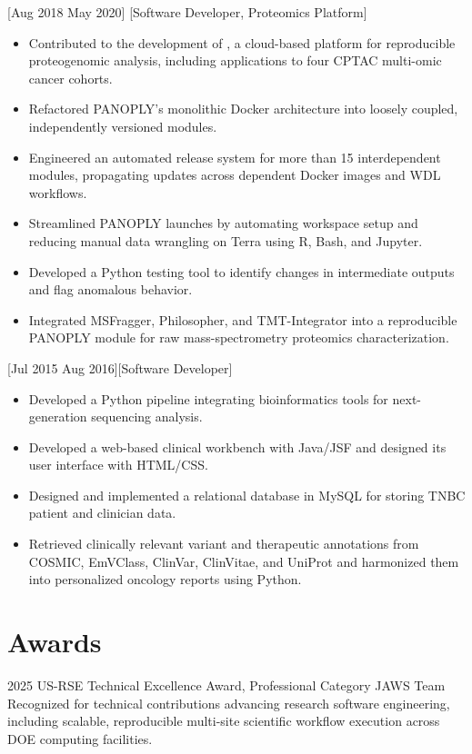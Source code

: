 \documentclass[11pt]{article}
\begin{document}
\jobseparator
{}[Aug 2018 \textendash{} May 2020]
  [Software Developer, Proteomics Platform]
\begin{itemize}
  \item Contributed to the development of , a cloud-based platform for reproducible proteogenomic analysis, including applications to four CPTAC multi-omic cancer cohorts.
  \item Refactored PANOPLY's monolithic Docker architecture into loosely coupled, independently versioned modules.
  \item Engineered an automated release system for more than 15 interdependent modules, propagating updates across dependent Docker images and WDL workflows.
  \item Streamlined PANOPLY launches by automating workspace setup and reducing manual data wrangling on Terra using R, Bash, and Jupyter.
  \item Developed a Python testing tool to identify changes in intermediate outputs and flag anomalous behavior.
  \item Integrated MSFragger, Philosopher, and TMT-Integrator into a reproducible PANOPLY module for raw mass-spectrometry proteomics characterization.
\end{itemize}

\jobseparator
{}[Jul 2015 \textendash{} Aug 2016][Software Developer]
\begin{itemize}
  \item Developed a Python pipeline integrating bioinformatics tools for next-generation sequencing analysis.
  \item Developed a web-based clinical workbench with Java/JSF and designed its user interface with HTML/CSS.
  \item Designed and implemented a relational database in MySQL for storing TNBC patient and clinician data.
  \item Retrieved clinically relevant variant and therapeutic annotations from COSMIC, EmVClass, ClinVar, ClinVitae, and UniProt and harmonized them into personalized oncology reports using Python.
\end{itemize}

\section{Awards}
\awardentry
  {2025 US-RSE Technical Excellence Award, Professional Category}
  {}
  {JAWS Team}
  {Recognized for technical contributions advancing research software engineering, including scalable, reproducible multi-site scientific workflow execution across DOE computing facilities.}
\end{document}

